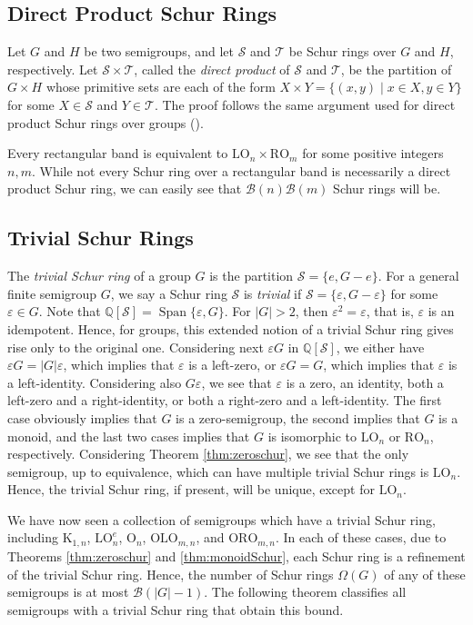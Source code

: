 \documentclass{article}
\theoremstyle{plain}
\theoremstyle{definition}
\newcommand{\thmref}[1]{Theorem \ref{#1}}
\renewcommand{\S}{\mathcal{S}}
\newcommand{\T}{\mathcal{T}}
\newcommand{\Q}{\mathbb{Q}}
\newcommand{\QS}{\Q[\S]}
\newcommand{\B}{\mathscr{B}}
\renewcommand{\O}{\mathrm{O}}
\newcommand{\K}{\mathrm{K}}
\newcommand{\LO}{\mathrm{LO}}
\newcommand{\RO}{\mathrm{RO}}
\newcommand{\ORO}{\mathrm{ORO}}
\newcommand{\OLO}{\mathrm{OLO}}
\DeclareMathOperator*{\Span}{Span}
\begin{document}
\subsection{Direct Product Schur Rings}
Let $G$ and $H$ be two semigroups, and let $\S$ and $\T$ be Schur rings over $G$ and $H$, respectively. Let \label{direct}$\S\times \T$, called the \emph{direct product} of $\S$ and $\T$, be the partition of $G\times H$ whose primitive sets are each of the form $X \times Y = \{(x,y)\mid x\in X, y\in Y\}$ for some $X\in \S$ and $Y\in \T$. The proof follows the same argument used for direct product Schur rings over groups (\cite[see Example 2.26]{MePhD}). 

Every rectangular band is equivalent to $\LO_n\times \RO_m$ for some positive integers $n, m$. While not every Schur ring over a rectangular band is necessarily a direct product Schur ring, we can easily see that $\B(n)\B(m)$ Schur rings will be. 

\subsection{Trivial Schur Rings}
The \emph{trivial Schur ring} of a group $G$ is the partition $\S = \{e, G-e\}$. For a general finite semigroup $G$, we say a Schur ring $\S$ is \emph{trivial} if $\S = \{\varepsilon, G-\varepsilon\}$ for some $\varepsilon\in G$. Note that $\QS = \Span\{\varepsilon,G\}$. For $|G|>2$, then $\varepsilon^2 = \varepsilon$, that is, $\varepsilon$ is an idempotent. Hence, for groups, this extended notion of a trivial Schur ring gives rise only to the original one. Considering next $\varepsilon G$ in $\QS$, we either have $\varepsilon G = |G|\varepsilon$, which implies that $\varepsilon$ is a left-zero, or $\varepsilon G = G$, which implies that $\varepsilon$ is a left-identity. Considering also $G\varepsilon$, we see that $\varepsilon$ is a zero, an identity, both a left-zero and a right-identity, or both a right-zero and a left-identity. The first case obviously implies that $G$ is a zero-semigroup, the second implies that $G$ is a monoid, and the last two cases implies that $G$ is isomorphic to $\LO_n$ or $\RO_n$, respectively. Considering \thmref{thm:zeroschur}, we see that the only semigroup, up to equivalence, which can have multiple trivial Schur rings is $\LO_n$. Hence, the trivial Schur ring, if present, will be unique, except for $\LO_n$.

We have now seen a collection of semigroups which have a trivial Schur ring, including $\K_{1,n}$, $\LO_n^e$, $\O_n$, $\OLO_{m,n}$, and $\ORO_{m,n}$. In each of these cases, due to Theorems \ref{thm:zeroschur} and \ref{thm:monoidSchur}, each Schur ring is a refinement of the trivial Schur ring. Hence, the number of Schur rings $\Omega(G)$ of any of these semigroups is at most $\B(|G|-1)$. The following theorem classifies all semigroups with a trivial Schur ring that obtain this bound.
\end{document}
